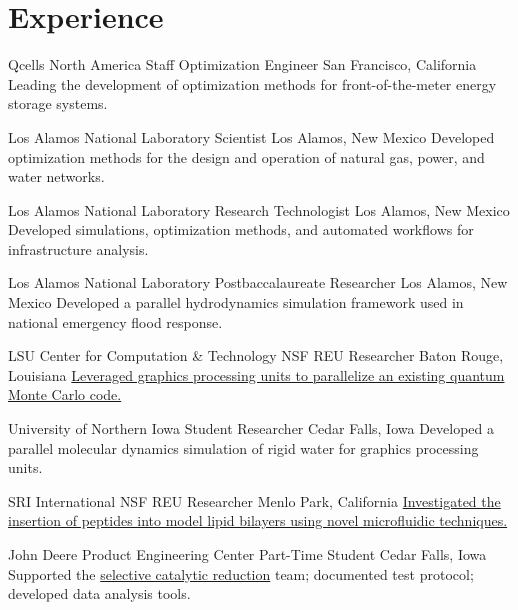 \section{Experience}
		{Qcells North America}
		{Staff Optimization Engineer}
		{San Francisco, California}{}
		{Leading the development of optimization methods for front-of-the-meter energy storage systems.}

		{Los Alamos National Laboratory}
		{Scientist}
		{Los Alamos, New Mexico}{}
		{Developed optimization methods for the design and operation of natural gas, power, and water networks.}

		{Los Alamos National Laboratory}
		{Research Technologist}
		{Los Alamos, New Mexico}{}
		{Developed simulations, optimization methods, and automated workflows for infrastructure analysis.}

		{Los Alamos National Laboratory}
		{Postbaccalaureate Researcher}
		{Los Alamos, New Mexico}{}
		{Developed a parallel hydrodynamics simulation framework used in national emergency flood response.}

		{LSU Center for Computation \& Technology}
		{NSF REU Researcher}
		{Baton Rouge, Louisiana}{}
		{\href{http://www.institute.loni.org/lasigma/package/vmc/}{Leveraged graphics processing units to parallelize an existing quantum Monte Carlo code.}}

		{University of Northern Iowa}
		{Student Researcher}
		{Cedar Falls, Iowa}{}
		{Developed a parallel molecular dynamics simulation of rigid water for graphics processing units.}

		{SRI International}
		{NSF REU Researcher}
		{Menlo Park, California}{}
		{\href{https://www.sri.com/wp-content/uploads/2019/12/sri-reu-2011-2.pdf}{Investigated the insertion of peptides into model lipid bilayers using novel microfluidic techniques.}}

		{John Deere Product Engineering Center}
		{Part-Time Student}
		{Cedar Falls, Iowa}{}
		{Supported the \href{https://www.deere.com/en/campaigns/engines-and-drivetrain/diesel-engine-technology}{selective catalytic reduction} team; documented test protocol; developed data analysis tools.}


